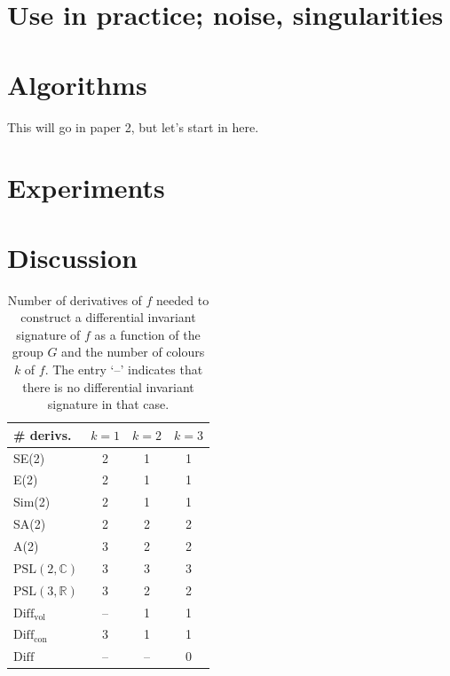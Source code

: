 \documentclass[review,onefignum,onetabnum]{siamonline190516}
\def\R{\mathbb{R}}
\begin{document}
\section{Use in practice; noise, singularities}

\section{Algorithms}
 This will go in paper 2, but let's start in here.



\section{Experiments}


\section{Discussion}

\begin{table}[h]
\begin{center}
\begin{tabular}{| l | c c c |}
\hline
\# derivs. & $k=1$ & $k=2$ & $k=3$ \\
\hline
SE(2) & 2 &1 & 1 \\
E(2) & 2 & 1 & 1 \\
Sim(2) & 2 & 1 & 1 \\
SA(2) & 2 & 2 & 2 \\
A(2) & 3 & 2 & 2 \\
$\mathrm{PSL}(2,\mathbb{C})$ & 3 & 3 & 3 \\
$\mathrm{PSL}(3,\R)$ & 3 & 2 & 2 \\
$\mathrm{Diff}_{\mathrm{vol}}$ & -- & 1 & 1 \\
$\mathrm{Diff}_{\mathrm{con}}$ & 3 & 1 & 1 \\
$\mathrm{Diff}$ & -- & -- & 0 \\
\hline
\end{tabular}
\caption{Number of derivatives of $f$ needed to construct a differential invariant signature of $f$ as a function of the group $G$ and the number of colours $k$ of $f$. The entry `--' indicates that there is no differential invariant signature in that case.}
\end{center}
\end{table}
\end{document}
